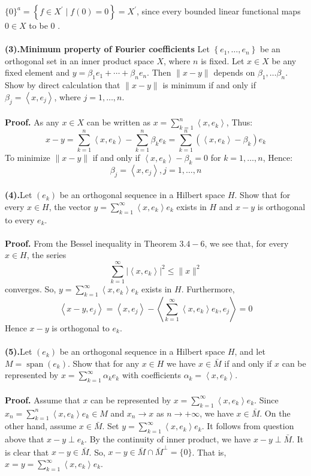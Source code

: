 \documentclass{homework}
\begin{document}
$\{0\}^a=\left\{f \in X^{\prime} \mid f(0)=0\right\}=X^{\prime}$, since every bounded linear functional maps $0 \in X$ to be 0 .
\\
\\
\textbf{(3).Minimum property of Fourier coefficients} Let $\left\{e_1, \ldots, e_n\right\}$ be an orthogonal set in an inner product space $X$, where $n$ is fixed. Let $x \in X$ be any fixed element and $y=\beta_1 e_1+\cdots+\beta_n e_n$. Then $\|x-y\|$ depends on $\beta_1, \ldots \beta_n$. Show by direct calculation that $\|x-y\|$ is minimum if and only if $\beta_j=\left\langle x, e_j\right\rangle$, where $j=1, \ldots, n$.
\\
\\
\textbf{Proof.} As any $x \in X$ can be written as $x=\sum_{k=1}^n \left\langle x, e_k\right\rangle $, Thus:
$$
x-y=\sum_{k=1}^n\left\langle x, e_k\right\rangle-\sum_{k=1}^n\beta_k e_k=\sum_{k=1}^n(\left\langle x, e_k\right\rangle-\beta_k)e_k
$$
To minimize $\|x-y\|$ if and only if $\left\langle x, e_k\right\rangle-\beta_k=0$ for $k=1, \ldots, n$, Hence:
$$
\beta_j=\left\langle x,e_j\right\rangle, j=1, \ldots, n
$$
\\
\textbf{(4).}Let $\left(e_k\right)$ be an orthogonal sequence in a Hilbert space $H$. Show that for every $x \in H$, the vector $y=\sum_{k=1}^{\infty}\left\langle x, e_k\right\rangle e_k$ exists in $H$ and $x-y$ is orthogonal to every $e_k$.
\\
\\
\textbf{Proof.} From the Bessel inequality in Theorem $3.4-6$, we see that, for every $x \in H$, the series
$$
\sum_{k=1}^{\infty}\left|\left\langle x, e_k\right\rangle\right|^2 \leq\|x\|^2
$$
converges. So, $y=\sum_{k=1}^{\infty}\left\langle x, e_k\right\rangle e_k$ exists in $H$. Furthermore,
$$
\left\langle x-y, e_j\right\rangle=\left\langle x, e_j\right\rangle-\left\langle\sum_{k=1}^{\infty}\left\langle x, e_k\right\rangle e_k, e_j\right\rangle=0
$$
Hence $x-y$ is orthogonal to $e_k$.
\\
\\
\textbf{(5).}Let $\left(e_k\right)$ be an orthogonal sequence in a Hilbert space $H$, and let $M=\operatorname{span}\left(e_k\right)$. Show that for any $x \in H$ we have $x \in \bar{M}$ if and only if $x$ can be represented by $x=\sum_{k=1}^{\infty} \alpha_k e_k$ with coefficients $\alpha_k=\left\langle x, e_k\right\rangle$.
\\
\\
\textbf{Proof.} Assume that $x$ can be represented by $x=\sum_{k=1}^{\infty}\left\langle x, e_k\right\rangle e_k$. Since $x_n=\sum_{k=1}^n\left\langle x, e_k\right\rangle e_k \in M$ and $x_n \rightarrow x$ as $n \rightarrow+\infty$, we have $x \in \bar{M}$. On the other hand, assume $x \in \bar{M}$. Set $y=\sum_{k=1}^{\infty}\left\langle x, e_k\right\rangle e_k$. It follows from question above that $x-y \perp e_k$. By the continuity of inner product, we have $x-y \perp \bar{M}$. It is clear that $x-y \in \bar{M}$. So, $x-y \in \bar{M} \cap \bar{M}^{\perp}=\{0\}$. That is, $x=y=\sum_{k=1}^{\infty}\left\langle x, e_k\right\rangle e_k$.
\end{document}
